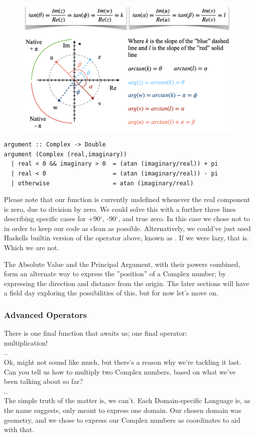 \begin{figure}[h!]
    \centering
    \includegraphics[scale= 0.5]{tan.png}
    \caption{}
    \label{tan}
\end{figure}

\begin{verbatim}
argument :: Complex -> Double
argument (Complex (real,imaginary))
  | real < 0 && imaginary > 0  = (atan (imaginary/real)) + pi
  | real < 0                   = (atan (imaginary/real)) - pi
  | otherwise                  = atan (imaginary/real)
\end{verbatim}

Please note that our function is currently undefined whenever the real component is zero, due to division by zero. We could solve this with a further three lines describing specific cases for +90$^{\circ}$, -90$^{\circ}$, and true zero. In this case we chose not to in order to keep our code as clean as possible. Alternatively, we could've just used Haskells builtin version of the operator above, known as . If we were lazy, that is. Which we are not.
\vspace{5mm}

The Absolute Value and the Principal Argument, with their powers combined, form an alternate way to express the ''position'' of a Complex number; by expressing the direction and distance from the origin. The later sections will have a field day exploring the possibilities of this, but for now let's move on.

\subsubsection{Advanced Operators}

There is one final function that awaits us; one final operator:\\ multiplication!\\
..\\
Ok, might not sound like much, but there's a reason why we're tackling it last.\\
Can you tell us how to multiply two Complex numbers, based on what we've been talking about so far?\\
..\\
The simple truth of the matter is, we can't. Each Domain-specific Language is, as the name suggests, only meant to express one domain. Our chosen domain was geometry, and we chose to express our Complex numbers as coordinates to aid with that.

